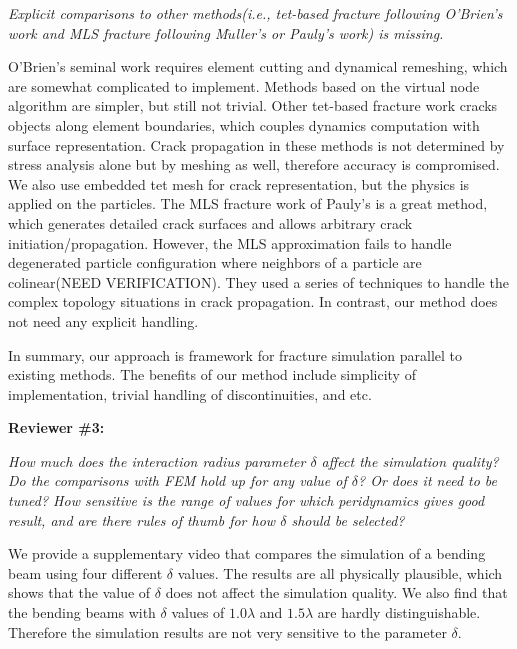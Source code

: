 \emph{Explicit comparisons to other methods(i.e., tet-based fracture following O'Brien's work and MLS fracture following M$\ddot{u}$ller's or Pauly's work) is missing.}

O'Brien's seminal work \cite{O'Brien:1999:GMA:311535.311550,O'Brien:2002:GMA:566654.566579} requires element cutting and dynamical remeshing, which are somewhat complicated to implement. Methods based on the virtual node algorithm \cite{Molino2004} are simpler, but still not trivial. Other tet-based fracture work\cite{smith2001fast,Muller2001} cracks objects along element boundaries, which couples dynamics computation with surface representation. Crack propagation in these methods is not determined by stress analysis alone but by meshing as well, therefore accuracy is compromised. We also use embedded tet mesh for crack representation, but the physics is applied on the particles. The MLS fracture work of Pauly's\cite{Pauly:2005:MAF:1073204.1073296} is a great method, which generates detailed crack surfaces and allows arbitrary crack initiation/propagation. However, the MLS approximation fails to handle degenerated particle configuration where neighbors of a particle are colinear(NEED VERIFICATION). They used a series of techniques to handle the complex topology situations in crack propagation. In contrast, our method does not need any explicit handling.

In summary, our approach is framework for fracture simulation parallel to existing methods. The benefits of our method include simplicity of implementation, trivial handling of discontinuities, and etc.

\noindent{}\textbf{Reviewer \#3:}

\emph{How much does the interaction radius parameter $\delta$ affect the simulation quality? Do the comparisons with FEM hold up for any value of $\delta$? Or does it need to be tuned? How sensitive is the range of values for which peridynamics gives good result, and are there rules of thumb for how $\delta$ should be selected?}

We provide a supplementary video that compares the simulation of a bending beam using four different $\delta$ values. The results are all physically plausible, which shows that the value of $\delta$ does not affect the simulation quality. We also find that the bending beams with $\delta$ values of $1.0\lambda$ and $1.5\lambda$ are hardly distinguishable. Therefore the simulation results are not very sensitive to the parameter $\delta$.

